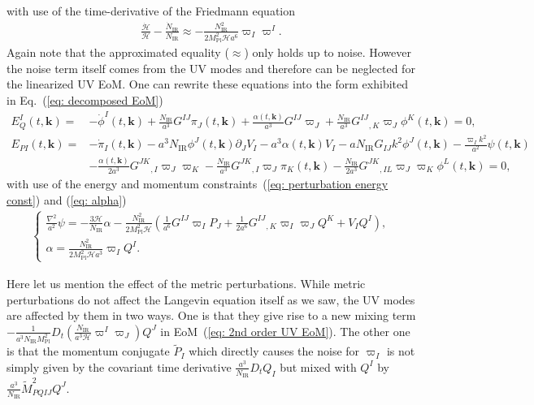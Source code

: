 \documentclass[a4paper,11pt]{article}
\newcommand{\Mpl}{M_\text{Pl}}
\newcommand{\IR}{\text{IR}}
\newcommand{\dps}{\displaystyle}
\newcommand{\calH}{\mathcal{H}}
\newcommand{\bae}[1]{\begin{align} #1 \end{align}}
\newcommand{\bce}[1]{\begin{cases} #1 \end{cases}}
\begin{document}
with use of the time-derivative of the Friedmann equation
\bae{ 
	\frac{\dot{\calH}}{\calH}-\frac{\dot{N}_\IR}{N_\IR}\approx-\frac{N_\IR^2}{2\Mpl^2\calH a^6}\varpi_I\varpi^I.
}
Again note that the approximated equality ($\approx$) only holds up to noise. However the noise term itself comes from the UV modes
and therefore can be neglected for the linearized UV EoM.
One can rewrite these equations into the form exhibited in Eq.~(\ref{eq: decomposed EoM})
\bae{
	E_Q^I(t,\mathbf{k})=&-\dot{\phi}^I(t,\mathbf{k})+\frac{N_\IR}{a^3}G^{IJ}\pi_J(t,\mathbf{k})
	+\frac{\alpha(t,\mathbf{k})}{a^3}G^{IJ}\varpi_J+\frac{N_\IR}{a^3}G^{IJ}{}_{,K}\varpi_J\phi^K(t,\mathbf{k})=0, \\
	E_{PI}(t,\mathbf{k})=&-\dot{\pi}_I(t,\mathbf{k})-a^3N_\IR\phi^J(t,\mathbf{k})\partial_JV_I-a^3\alpha(t,\mathbf{k})V_I
	-aN_\IR G_{IJ}k^2\phi^J(t,\mathbf{k})-\frac{\varpi_Ik^2}{a^2}\psi(t,\mathbf{k})
	\nonumber \\
	&-\frac{\alpha(t,\mathbf{k})}{2a^3}G^{JK}{}_{,I}\varpi_J\varpi_K 
	-\frac{N_\IR}{a^3}G^{JK}{}_{,I}\varpi_J\pi_K(t,\mathbf{k})-\frac{N_\IR}{2a^3}G^{JK}{}_{,IL}\varpi_J\varpi_K\phi^L(t,\mathbf{k})=0,
}
with use of the energy and momentum constraints~(\ref{eq: perturbation energy const}) and (\ref{eq: alpha})
\bae{
	\bce{
		\dps
		\frac{\nabla^2}{a^2}\psi=-\frac{3\calH}{N_\IR}\alpha
		-\frac{N_\IR^2}{2\Mpl^2\calH}\left(\frac{1}{a^6}G^{IJ}\varpi_IP_J+\frac{1}{2a^6}G^{IJ}{}_{,K}\varpi_I\varpi_JQ^K+V_IQ^I\right), \\[10pt]
		\dps
		\alpha=\frac{N_\IR^2}{2\Mpl^2\calH a^3}\varpi_IQ^I.
	}
}

Here let us mention the effect of the metric perturbations.
While metric perturbations do not affect the Langevin equation itself as we saw,
the UV modes are affected by them in two ways. One is that they give rise to a new mixing term
$-\frac{1}{a^3N_\IR\Mpl^2}D_t\left(\frac{N_\IR}{a^3\calH}\varpi^I\varpi_J\right)Q^J$ in EoM~(\ref{eq: 2nd order UV EoM}).
The other one is that the momentum conjugate $\tilde{P}_I$ which directly causes the noise for $\varpi_I$ is not simply given by
the covariant time derivative $\frac{a^3}{N_\IR}D_tQ_I$ but mixed with $Q^I$ by $\frac{a^3}{N_\IR}\tilde{M}^2_{PQIJ}Q^J$.
\end{document}
